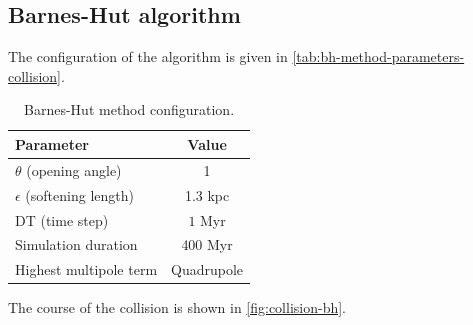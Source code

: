 \subsection{Barnes-Hut algorithm}
The configuration of the algorithm is given in \autoref{tab:bh-method-parameters-collision}.
\begin{table}[htp]
    \centering
    \begin{tabular}{|l|c|}
        \hline
        \textbf{Parameter}            & \textbf{Value} \\
        \hline
        $\theta$ (opening angle)      & 1              \\
        $\epsilon$ (softening length) & 1.3 kpc        \\
        DT (time step)                & $1$ Myr        \\
        Simulation duration           & 400 Myr        \\
        Highest multipole term        & Quadrupole     \\
        \hline
    \end{tabular}
    \caption{Barnes-Hut method configuration.}
    \label{tab:bh-method-parameters-collision}
\end{table}
The course of the collision is shown in \autoref{fig:collision-bh}.
